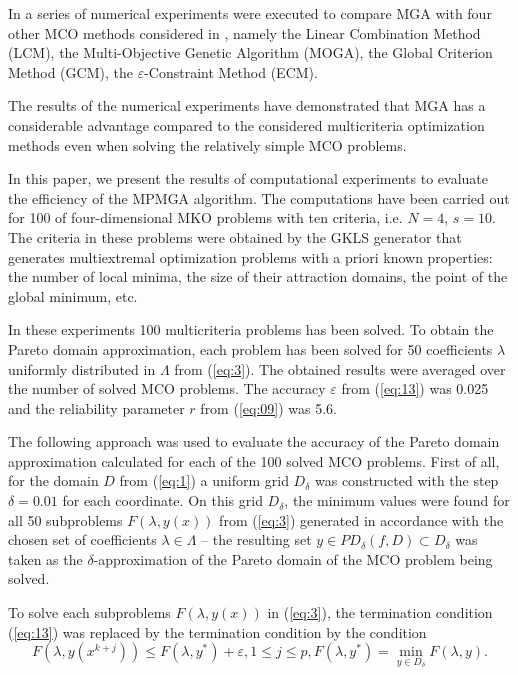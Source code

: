 \documentclass[runningheads]{llncs}
\begin{document}
In \cite{c16} a series of numerical experiments were executed to compare MGA with four other MCO methods considered in \cite{c22}, namely the Linear Combination Method (LCM), the Multi-Objective Genetic Algorithm (MOGA), the Global Criterion Method (GCM), the $\varepsilon$-Constraint Method (ECM).

The results of the numerical experiments have demonstrated that MGA has a considerable advantage compared to the considered multicriteria optimization methods even when solving the relatively simple MCO problems.

In this paper, we present the results of computational experiments to evaluate the efficiency of the MPMGA algorithm. The computations have been carried out for 100 of four-dimensional MKO problems with ten criteria, i.e. $N = 4$, $s = 10$. The criteria in these problems were obtained by the GKLS generator \cite{c23} that generates multiextremal optimization problems with a priori known properties: the number of local minima, the size of their attraction domains, the point of the global minimum, etc. 

In these experiments 100 multicriteria problems has been solved. To obtain the Pareto domain approximation, each problem has been solved for 50 coefficients $\lambda$ uniformly distributed in $\Lambda$ from (\ref{eq:3}). The obtained results were averaged over the number of solved MCO problems. The accuracy $\varepsilon$ from (\ref{eq:13}) was 0.025 and the reliability parameter $r$ from (\ref{eq:09}) was 5.6.

The following approach was used to evaluate the accuracy of the Pareto domain approximation calculated for each of the 100 solved MCO problems. First of all, for the domain $D$ from (\ref{eq:1}) a uniform grid $D_\delta$ was constructed with the step $\delta = 0.01$ for each coordinate. On this grid $D_\delta$, the minimum values were found for all 50 subproblems $F(\lambda,y(x))$  from (\ref{eq:3}) generated in accordance with the chosen set of coefficients $\lambda \in \Lambda$ -- the resulting set $y\in PD_\delta (f,D)\subset D_\delta$ was taken as the $\delta$-approximation of the Pareto domain of the MCO problem being solved.

To solve each subproblems $F(\lambda,y(x))$ in (\ref{eq:3}), the termination condition (\ref{eq:13}) was replaced by the termination condition by the condition
\begin{equation*}
F(\lambda,y(x^{k+j})) \leq F(\lambda,y^* )+\varepsilon,1 \leq j \leq p,  F(\lambda,y^*) = \min_{y\in D_\delta}{F(\lambda,y)}.
\end{equation*}
\end{document}
